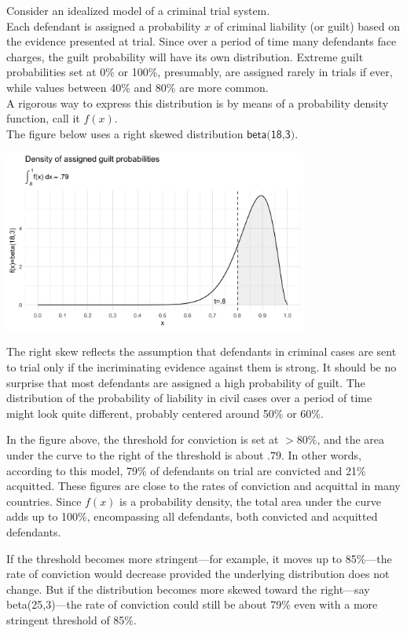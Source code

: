\documentclass[10pt,dvipsnames]{scrartcl}
\begin{document}
Consider an idealized model of a criminal trial system.\\
Each defendant is assigned a probability \(x\) of criminal liability (or
guilt) based on the evidence presented at trial. Since over a period of
time many defendants face charges, the guilt probability will have its
own distribution. Extreme guilt probabilities set at 0\% or 100\%,
presumably, are assigned rarely in trials if ever, while values between
40\% and 80\% are more common.\\
A rigorous way to express this distribution is by means of a probability
density function, call it \(f(x)\).\\
The figure below uses a right skewed distribution
\(\textsf{beta(18,3)}\).

\begin{center}
    \includegraphics[width=10cm]{beta(18,3)2.png}
\end{center}

\noindent
 The right skew reflects the assumption that defendants in criminal
cases are sent to trial only if the incriminating evidence against them
is strong. It should be no surprise that most defendants are assigned a
high probability of guilt. The distribution of the probability of
liability in civil cases over a period of time might look quite
different, probably centered around 50\% or 60\%.

In the figure above, the threshold for conviction is set at \(>80\%\),
and the area under the curve to the right of the threshold is about
\(.79\). In other words, according to this model, 79\% of defendants on
trial are convicted and 21\% acquitted. These figures are close to the
rates of conviction and acquittal in many countries. Since \(f(x)\) is a
probability density, the total area under the curve adds up to 100\%,
encompassing all defendants, both convicted and acquitted defendants.

If the threshold becomes more stringent---for example, it moves up to
85\%---the rate of conviction would decrease provided the underlying
distribution does not change. But if the distribution becomes more
skewed toward the right---say \textsf{beta(25,3)}---the rate of
conviction could still be about 79\% even with a more stringent
threshold of 85\%.
\end{document}
